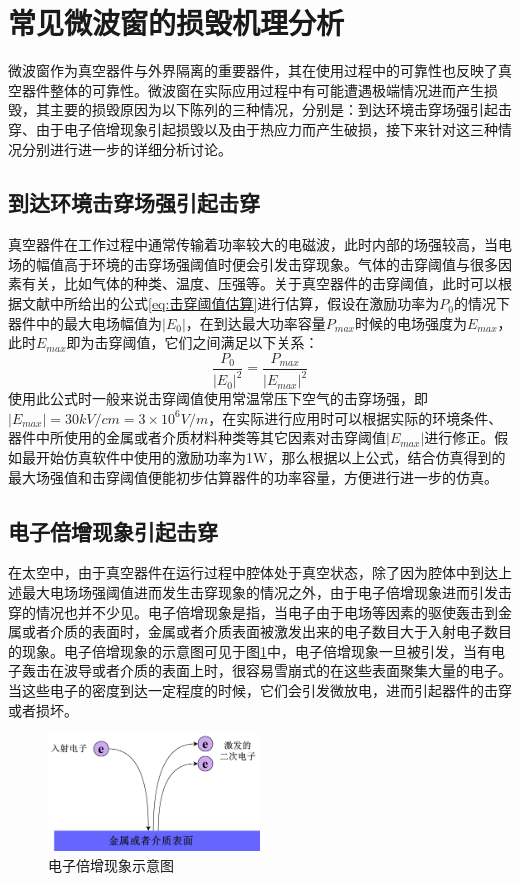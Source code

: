 \documentclass[master]{thesis-uestc}
\begin{document}
\section{常见微波窗的损毁机理分析}
微波窗作为真空器件与外界隔离的重要器件，其在使用过程中的可靠性也反映了真空器件整体的可靠性。微波窗在实际应用过程中有可能遭遇极端情况进而产生损毁，其主要的损毁原因为以下陈列的三种情况，分别是：到达环境击穿场强引起击穿、由于电子倍增现象引起损毁以及由于热应力而产生破损，接下来针对这三种情况分别进行进一步的详细分析讨论。
\subsection{到达环境击穿场强引起击穿}
真空器件在工作过程中通常传输着功率较大的电磁波，此时内部的场强较高，当电场的幅值高于环境的击穿场强阈值时便会引发击穿现象。气体的击穿阈值与很多因素有关，比如气体的种类、温度、压强等。关于真空器件的击穿阈值，此时可以根据文献\cite{chaiyuanyuan_window_2016}中所给出的公式\ref{eq:击穿阈值估算}进行估算，假设在激励功率为\(P_0\)的情况下器件中的最大电场幅值为\(\left| E_0 \right|\)，在到达最大功率容量\(P_{max}\)时候的电场强度为\(E_{max}\)，此时\(E_{max}\)即为击穿阈值，它们之间满足以下关系：
\begin{equation}\label{eq:击穿阈值估算}
    \frac{P_0}{\left|E_0\right|^2}=\frac{P_{max}}{\left|E_{max}\right|^2}
\end{equation}
使用此公式时一般来说击穿阈值使用常温常压下空气的击穿场强，即\(\left|E_{max}\right| = 30kV/cm = 3 \times 10^6V/m\)，在实际进行应用时可以根据实际的环境条件、器件中所使用的金属或者介质材料种类等其它因素对击穿阈值\(\left|E_{max}\right|\)进行修正。假如最开始仿真软件中使用的激励功率为1W，那么根据以上公式，结合仿真得到的最大场强值和击穿阈值便能初步估算器件的功率容量，方便进行进一步的仿真。
\subsection{电子倍增现象引起击穿}\label{sec:电子倍增现象理论}
在太空中，由于真空器件在运行过程中腔体处于真空状态，除了因为腔体中到达上述最大电场场强阈值进而发生击穿现象的情况之外，由于电子倍增现象进而引发击穿的情况也并不少见。电子倍增现象是指，当电子由于电场等因素的驱使轰击到金属或者介质的表面时，金属或者介质表面被激发出来的电子数目大于入射电子数目的现象。电子倍增现象的示意图可见于图\ref{fig:二次电子发射示意图}中，电子倍增现象一旦被引发，当有电子轰击在波导或者介质的表面上时，很容易雪崩式的在这些表面聚集大量的电子。当这些电子的密度到达一定程度的时候，它们会引发微放电，进而引起器件的击穿或者损坏。
\begin{figure}[!htb]
    \centering
    \includegraphics[width=0.5\textwidth]{pic/chapter2/二次电子发射示意图.png}
    \caption{电子倍增现象示意图}
    \label{fig:二次电子发射示意图}
\end{figure}
\end{document}
